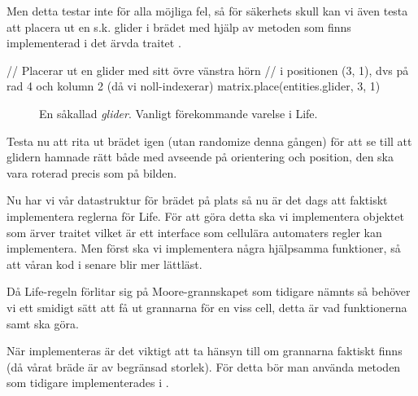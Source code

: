         Men detta testar inte för alla möjliga fel, så för säkerhets skull kan vi även testa att placera ut en s.k. glider i brädet med hjälp av metoden  som finns implementerad i det ärvda traitet .

\begin{Code}
// Placerar ut en glider med sitt övre vänstra hörn
// i positionen (3, 1), dvs på rad 4 och kolumn 2 (då vi noll-indexerar)
matrix.place(entities.glider, 3, 1)
\end{Code}

\begin{figure}[h]
  \begin{center}
  \end{center}
  \caption{En såkallad \textit{glider}. Vanligt förekommande varelse i Life.}
\end{figure}

        Testa nu att rita ut brädet igen (utan randomize denna gången) för att se till att glidern hamnade rätt både med avseende på orientering och position, den ska vara roterad precis som på bilden.


    
    Nu har vi vår datastruktur för brädet på plats så nu är det dags att faktiskt implementera reglerna för Life. För att göra detta ska vi implementera objektet  som ärver traitet  vilket är ett interface som cellulära automaters regler kan implementera. Men först ska vi implementera några hjälpsamma funktioner, så att våran kod i  senare blir mer lättläst.
    
        
        Då Life-regeln förlitar sig på Moore-grannskapet som tidigare nämnts så behöver vi ett smidigt sätt att få ut grannarna för en viss cell, detta är vad funktionerna  samt  ska göra.
        
        När  implementeras är det viktigt att ta hänsyn till om grannarna faktiskt finns (då vårat bräde är av begränsad storlek).
        För detta bör man använda  metoden som tidigare implementerades i .
        
